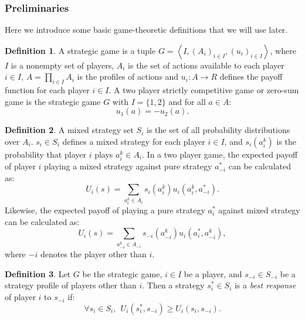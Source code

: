 \documentclass{article}
\theoremstyle{definition}
\newtheorem{definition}{Definition}
\begin{document}
\subsubsection{Preliminaries}
Here we introduce some basic game-theoretic definitions \cite{myerson1991game} that we will use later.

\begin{definition} \label{game}
A strategic game is a tuple $G= \left \langle I,(A_{i})_{i\in I},(u_{i})_{i\in I} \right \rangle$, where $I$ is a nonempty set of players, $A_{i}$ is the set of actions available to each player $i\in I$, $A = \prod_{i \in I}A_i$ is the profiles of actions and $u_{i}: A \rightarrow R$ defines the payoff function for each player $i\in I$.  
 A two player strictly competitive game or zero-sum game is the strategic game $G$ with $I=\{1, 2\}$ and for all $a \in A$:
\begin{equation*}
    u_{1}(a) = -u_{2}(a).
\end{equation*}
\end{definition} 

\begin{definition}
   A mixed strategy set $S_i$ is the set of all probability distributions over $A_i$. $s_i \in S_i$ defines a mixed strategy for each player $i \in I$, and $s_i(a_i^k)$ is the probability that player $i$ plays $a_i^k \in A_i$. In a two player game, the expected payoff of player $i$ playing a mixed strategy against pure strategy $a_{-i}^*$ can be calculated as:
   \begin{equation*}
       U_i(s) = \sum_{a_i^k\in A_i} s_i(a_i^k) u_i(a_i^k, a_{-i}^*).
   \end{equation*}
   Likewise, the expected payoff of playing a pure strategy $a_i^*$ against mixed strategy can be calculated as:
   \begin{equation*}
       U_i(s) = \sum_{a_{-i}^k \in A_{-i}} s_{-i}(a_{-i}^k) u_i(a_i^*, a_{-i}^k),
   \end{equation*}
   where $-i$ denotes the player other than $i$.
\end{definition}

\begin{definition} \label{response}
Let $G$ be the strategic game, $i \in I$ be a player, and $s_{-i} \in S_{-i}$ be a strategy profile of players other than $i$. Then a strategy $s^{*}_i \in S_i$ is a \textit{best response} of player $i$ to $s_{-i}$ if:
\begin{equation*}
    \forall s_{i} \in S_{i}, \ \ U_{i}(s_{i}^{*}, s_{-i})\geq U_{i}(s_{i}, s_{-i}).
\end{equation*}
\end{definition}
\end{document}

